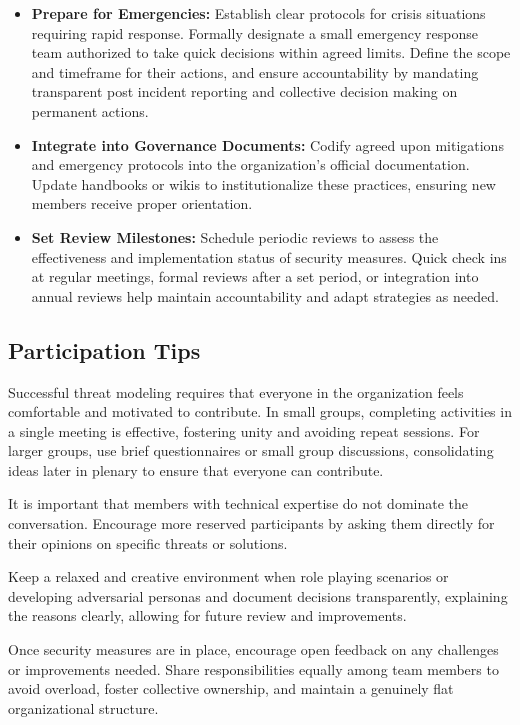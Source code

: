 \begin{itemize}
    \item \textbf{Prepare for Emergencies:} Establish clear protocols for crisis
    situations requiring rapid response. Formally designate a small emergency
    response team authorized to take quick decisions within agreed limits. Define
    the scope and timeframe for their actions, and ensure accountability by
    mandating transparent post incident reporting and collective decision making on
    permanent actions.
    
    \item \textbf{Integrate into Governance Documents:} Codify agreed upon
    mitigations and emergency protocols into the organization's official
    documentation. Update handbooks or wikis to institutionalize these practices,
    ensuring new members receive proper orientation.
    
    \item \textbf{Set Review Milestones:} Schedule periodic reviews to assess the
    effectiveness and implementation status of security measures. Quick check ins at
    regular meetings, formal reviews after a set period, or integration into annual
    reviews help maintain accountability and adapt strategies as needed.
    
\end{itemize}

\subsection{Participation Tips}
\label{subsec:participation_tips}

Successful threat modeling requires that everyone in the organization feels comfortable
and motivated to contribute. In small groups, completing activities in a single meeting is
effective, fostering unity and avoiding repeat sessions. For larger groups, use
brief questionnaires or small group discussions, consolidating ideas later in
plenary to ensure that everyone can contribute.

It is important that members with technical expertise do not dominate the
conversation. Encourage more reserved participants by asking them directly for
their opinions on specific threats or solutions.

Keep a relaxed and creative environment when role playing scenarios or
developing adversarial personas and document decisions transparently,
explaining the reasons clearly, allowing for future review and improvements.

Once security measures are in place, encourage open feedback on any challenges
or improvements needed. Share responsibilities equally among team members to
avoid overload, foster collective ownership, and maintain a genuinely flat
organizational structure.

\section*{}
